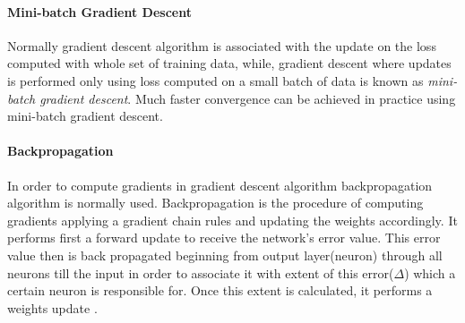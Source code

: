 \paragraph{Mini-batch Gradient Descent} Normally gradient descent algorithm
is associated with the update on the loss computed with whole set of training data,
while, gradient descent where updates is performed only using loss computed
on a small batch of data is known as \emph{mini-batch gradient descent}.
Much faster convergence can be achieved in practice using mini-batch gradient descent.
\cite{KarpathyAndrej2016}













\paragraph{Backpropagation} In order to compute gradients in gradient descent algorithm
backpropagation algorithm is normally used. Backpropagation is the procedure of computing
gradients applying a gradient chain rules and updating the weights accordingly.
It performs first a forward update to receive the network's error value. This error
value then is back propagated beginning from output layer(neuron) through all neurons
till the input in order to associate it with extent of this error($\Delta$)
which a certain neuron is responsible
for. Once this extent is calculated, it performs a weights update \cite{Rumelhart1986}.

